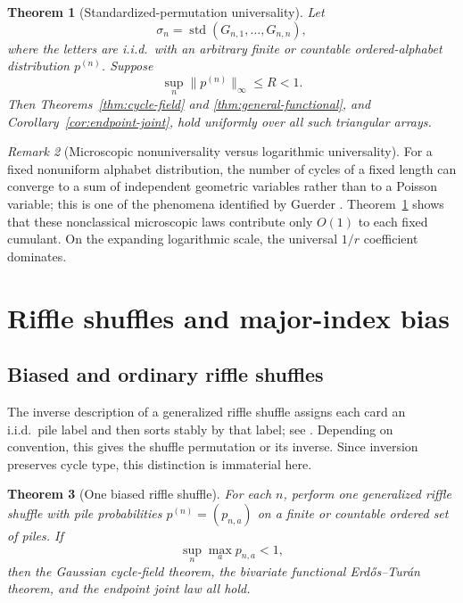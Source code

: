 \documentclass[11pt]{article}
\newtheorem{theorem}{Theorem}[section]
\theoremstyle{definition}
\theoremstyle{remark}
\newtheorem{remark}[theorem]{Remark}
\begin{document}
\begin{theorem}[Standardized-permutation universality]
\label{thm:standardized}
Let
\[
 \sigma_n=\operatorname{std}(G_{n,1},\ldots,G_{n,n}),
\]
where the letters are i.i.d.\ with an arbitrary finite or countable
ordered-alphabet distribution $p^{(n)}$.  Suppose
\[
 \sup_n\|p^{(n)}\|_\infty\le R<1.
\]
Then Theorems~\ref{thm:cycle-field} and
\ref{thm:general-functional}, and Corollary~\ref{cor:endpoint-joint}, hold
uniformly over all such triangular arrays.
\end{theorem}

\begin{remark}[Microscopic nonuniversality versus logarithmic universality]
For a fixed nonuniform alphabet distribution, the number of cycles of a
fixed length can converge to a sum of independent geometric variables
rather than to a Poisson variable; this is one of the phenomena identified
by Guerder \cite{Guerder2026}.  Theorem~\ref{thm:standardized} shows that
these nonclassical microscopic laws contribute only $O(1)$ to each fixed
cumulant.  On the expanding logarithmic scale, the universal $1/r$
coefficient dominates.
\end{remark}

\section{Riffle shuffles and major-index bias}

\subsection{Biased and ordinary riffle shuffles}

The inverse description of a generalized riffle shuffle assigns each card
an i.i.d.\ pile label and then sorts stably by that label; see
\cite{BayerDiaconis1992,Stanley2001}.  Depending on convention, this gives
the shuffle permutation or its inverse.  Since inversion preserves cycle
type, this distinction is immaterial here.

\begin{theorem}[One biased riffle shuffle]\label{thm:biased-riffle}
For each $n$, perform one generalized riffle shuffle with pile
probabilities $p^{(n)}=(p_{n,a})$ on a finite or countable ordered set of
piles.  If
\[
 \sup_n\max_a p_{n,a}<1,
\]
then the Gaussian cycle-field theorem, the bivariate functional
Erd\H{o}s--Tur\'an theorem, and the endpoint joint law all hold.
\end{theorem}
\end{document}

